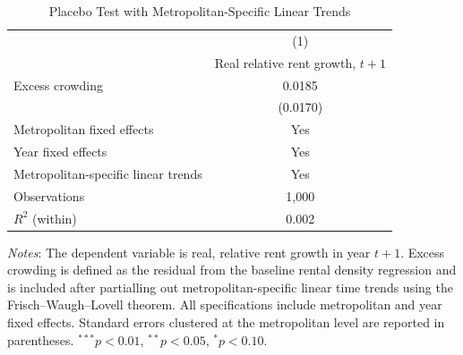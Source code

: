 \begin{table}[!htbp]
\centering
\caption{Placebo Test with Metropolitan-Specific Linear Trends}
\label{tab:placebo_linear_trend}
\begin{tabular}{l c}
\hline\hline
 & (1) \\
 & Real relative rent growth, $t+1$ \\
\hline
Excess crowding          & 0.0185 \\
                         & (0.0170) \\
\hline
Metropolitan fixed effects        & Yes \\
Year fixed effects                & Yes \\
Metropolitan-specific linear trends & Yes \\
Observations                      & 1,000 \\
$R^{2}$ (within)                  & 0.002 \\
\hline\hline
\end{tabular}

\begin{flushleft}
\footnotesize
\textit{Notes}: The dependent variable is real, relative rent growth in year $t+1$.
Excess crowding is defined as the residual from the baseline rental density regression
and is included after partialling out metropolitan-specific linear time trends using
the Frisch--Waugh--Lovell theorem. All specifications include metropolitan and year
fixed effects. Standard errors clustered at the metropolitan level are reported in
parentheses. $^{***}p<0.01$, $^{**}p<0.05$, $^{*}p<0.10$.
\end{flushleft}
\end{table}
